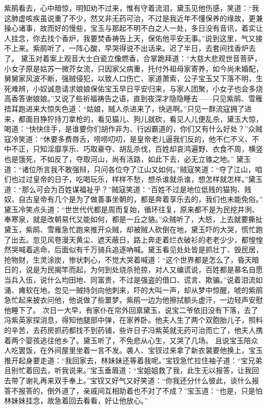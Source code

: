 \documentclass[12pt,oneside]{book}
\begin{document}
紫鹃看去，心中暗惊，明知劝不过来，惟有守着流泪，黛玉见他伤感，笑道：“我这肺虚咳疾虽说重了不少，然又非无药可治，不过是我近年不懂保养的缘故，更兼操心诸事，故而好的慢些，宝玉与那起不明不白之人一处，多日没有音讯，着实让人挂念，你去找个香炉，我要焚香祷告上天，保佑他平安无事。”说到这里，气又接不上来。紫鹃听了，一阵心酸，早哭得说不出话来。迟了半日，去套间找香炉去了。
黛玉对着案上观音大士白瓷立像燃香，合掌跪拜道：“大慈大悲观世音菩萨，小女子原是姑苏一微芥女流，只因家父病重，托付外祖母家寄养，如今尚未婚配，舅舅家风波不断，强贼侵犯，以致人口伤亡、家道萧索，公子宝玉又下落不明，生死难辨，小奴诚恳请求娘娘保佑宝玉早日平安归来，与家人团聚，小女子也会多烧高香答谢娘娘。”又说了些祈福祷告之语，直到夜深才隐隐睡去——只见紫鹃、雪雁捂耳跑进来大惊失色道：“姑娘，贼人杀进来了，快逃啊。”只见一群流寇拥了进来，都面目狰狞持刀拿枪的，看见猫儿、狗儿就砍，看见人儿便乱杀，黛玉大惊，喝道：“快快住手，是谁要你们胡作非为、行凶霸道的，你们又有什么好处？”众贼寇冷笑道：“休要多费唇舌，唠唠叨叨，是皇帝老儿逼我们反的，他不仁不义、不中不正，只知淫靡享乐、巧取豪夺、胡乱杀伐，百姓却哀鸿遍野、衣食不周，横竖也是饿死，不如反了，夺取河山，尚有活路，如此下去，必无立锥之地。”
黛玉道：“诸位所言我不敢强辩，只问各位夺了江山又如何。”贼寇笑道：“夺了江山，咱们也过过皇帝的日子，吃喝玩乐，样样不愁，想杀谁就杀谁，想怎样就怎样。”黛玉道：“那么可会为百姓谋福祉乎？”贼寇笑道：“百姓不过是地位低贱的猫狗、贱奴，自古皇帝有几个是为了做善事坐朝的，都是奔着享乐去的，我们也未能免俗。”
黛玉冷笑点头道：“世世代代都是周而复始，循环往复，原来都不是为民挖井洌、奉寒泉，就是改朝易代又能如何，都是一丘之貉。”众贼听了，大怒，上去就要撕扯黛玉，紫鹃、雪雁急忙跑来推开众贼，却被贼人砍倒在地，黛玉吓的大哭，慌忙跑了出去。忽见风卷漫天黄尘、遮天蔽日，路上奔走着烂衣破衫的老老少少，都惶惶然哭喊着逃命，后面似有千万骑兵追逐吶喊。黛玉看见处处皆是抓壮丁、毁民居，抢物财，生灵涂炭，惨状刺心，不觉大哭着喊道：“这个世界都是怎么了，昏天暗日的，说是为民揭竿而起，为何到处烧杀抢掠，对人又编谎说，百姓都是慕名自愿当兵入伍，说什么均田地、同富贵，不过是强盗的借口、谎言、欺骗。”说着泪流如涌、瘫软在地，忽见一贼持剑向他刺来，吓的大叫一声，却从梦中惊醒，唬的紫鹃急忙起来披衣问他，他说做了些噩梦，紫鹃一边为他擦拭额头虚汗，一边轻声安慰他睡下了。
次日一大早，有家仆在帘外回禀黛玉，说宝二爷依旧没有下落，去了冯紫英家探消息，得知他腿部中弹，在家养卧。他夫人生了两个双胞胎儿子，照料的辛苦，去药房抓药都找不到药铺，些许日子冯紫英就无药可治而亡了，他夫人携着两个婴孩逃往他乡了。黛玉听了，不免悲从心生，又哭了几场。
且说宝玉陪众人吃罢饭，在外间屋里坐着一言不发。袭人、宝钗过来拿了新衣裳要他换上，宝玉推开起身要走道：“我回家去，林妹妹还等着我呢。”宝钗急忙拉住袖子道：“宝兄弟且别忙着回去，听我说来。”宝玉垂眉道：“宝姐姐救了我，此生无以报答，让我回去带了谢礼再来双手奉上。”宝钗又好气又好笑道：“你我还分什么彼此，谈什么报答不报答的，倒外道了，亲戚间互相助着也不对了不成？”宝玉道：“也是，只是怕林妹妹挂念，故急着回去看看，好让他放心。”
\end{document}
